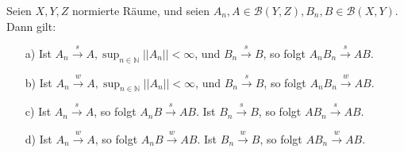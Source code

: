 \begin{exercise}
Seien $X,Y,Z$ normierte Räume, und seien $A_n,A \in \mathcal{B}(Y,Z),B_n,B\in \mathcal{B}(X,Y)$.
Dann gilt:
\begin{itemize}
  \item [a)] Ist $A_n \stackrel{s}{\rightarrow} A, \sup_{n\in\mathbb{N}} ||A_n|| < \infty$,
  und $B_n \stackrel{s}{\rightarrow} B$, so folgt $A_nB_n \stackrel{s}{\rightarrow} AB$.
  \item [b)] Ist $A_n \stackrel{w}{\rightarrow} A, \sup_{n\in\mathbb{N}} ||A_n|| < \infty$,
  und $B_n \stackrel{s}{\rightarrow} B$, so folgt $A_nB_n \stackrel{w}{\rightarrow} AB$.
  \item [c)] Ist $A_n \stackrel{s}{\rightarrow} A$, so folgt $A_nB \stackrel{s}{\rightarrow} AB$.
  Ist $B_n \stackrel{s}{\rightarrow} B$, so folgt $AB_n \stackrel{s}{\rightarrow} AB$.
  \item [d)] Ist $A_n \stackrel{w}{\rightarrow} A$, so folgt $A_nB \stackrel{w}{\rightarrow} AB$.
  Ist $B_n \stackrel{w}{\rightarrow} B$, so folgt $AB_n \stackrel{w}{\rightarrow} AB$.
\end{itemize}
\end{exercise}

